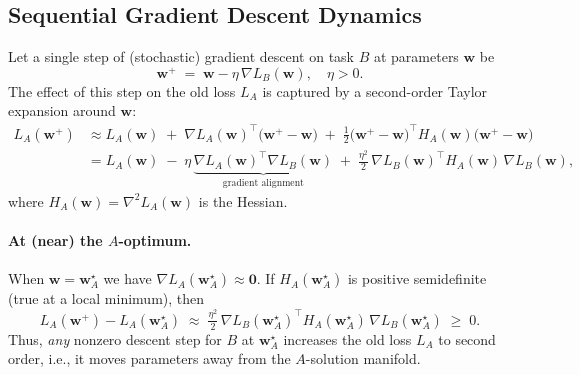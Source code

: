 \documentclass[12pt]{article}
\begin{document}
\subsection{Sequential Gradient Descent Dynamics}
Let a single step of (stochastic) gradient descent on task $B$ at parameters $\mathbf{w}$ be
\begin{equation}
\mathbf{w}^{+} \;=\; \mathbf{w} - \eta\, \nabla L_B(\mathbf{w}),
\quad \eta>0.
\label{eq:gd-update}
\end{equation}
The effect of this step on the old loss $L_A$ is captured by a second-order Taylor expansion around
$\mathbf{w}$:
\begin{align}
L_A(\mathbf{w}^{+})
&\approx L_A(\mathbf{w})
\;+\; \nabla L_A(\mathbf{w})^\top \!\big(\mathbf{w}^{+}-\mathbf{w}\big)
\;+\; \tfrac{1}{2}\big(\mathbf{w}^{+}-\mathbf{w}\big)^\top
H_A(\mathbf{w})\big(\mathbf{w}^{+}-\mathbf{w}\big)
\nonumber\\
&= L_A(\mathbf{w})
\;-\; \eta\, \underbrace{\nabla L_A(\mathbf{w})^\top \nabla L_B(\mathbf{w})}_{\text{gradient alignment}}
\;+\; \tfrac{\eta^2}{2}\, \nabla L_B(\mathbf{w})^\top H_A(\mathbf{w})\, \nabla L_B(\mathbf{w}),
\label{eq:taylor}
\end{align}
where $H_A(\mathbf{w}) = \nabla^2 L_A(\mathbf{w})$ is the Hessian.

\paragraph{At (near) the $A$-optimum.}
When $\mathbf{w}=\mathbf{w}_A^\star$ we have $\nabla L_A(\mathbf{w}_A^\star)\approx \mathbf{0}$. If
$H_A(\mathbf{w}_A^\star)$ is positive semidefinite (true at a local minimum), then
\begin{equation}
L_A(\mathbf{w}^{+}) - L_A(\mathbf{w}_A^\star)
\;\approx\; \tfrac{\eta^2}{2}\, \nabla L_B(\mathbf{w}_A^\star)^\top
H_A(\mathbf{w}_A^\star)\, \nabla L_B(\mathbf{w}_A^\star) \;\ge\; 0.
\label{eq:increase}
\end{equation}
Thus, \emph{any} nonzero descent step for $B$ at $\mathbf{w}_A^\star$ increases the old loss $L_A$ to
second order, i.e., it moves parameters away from the $A$-solution manifold.
\end{document}
